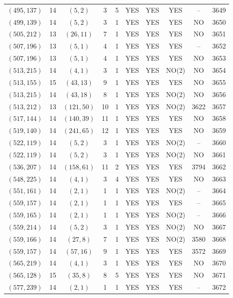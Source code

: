 \begin{longtable}{|c|c|c|c|c|c|c|c|c|c|}
$(495, 137)$ & 14 & $(5, 2)$ & 3 & 5 & YES & YES & YES & -- & 3649\\
$(499, 139)$ & 14 & $(5, 2)$ & 3 & 1 & YES & YES & YES & NO & 3650\\
$(505, 212)$ & 13 & $(26, 11)$ & 7 & 1 & YES & YES & YES & NO & 3651\\
$(507, 196)$ & 13 & $(5, 1)$ & 4 & 1 & YES & YES & YES & -- & 3652\\
$(507, 196)$ & 13 & $(5, 1)$ & 4 & 1 & YES & YES & YES & NO & 3653\\
$(513, 215)$ & 14 & $(4, 1)$ & 3 & 1 & YES & YES & NO(2) & NO & 3654\\
$(513, 155)$ & 15 & $(43, 13)$ & 9 & 1 & YES & YES & YES & NO & 3655\\
$(513, 215)$ & 14 & $(43, 18)$ & 8 & 1 & YES & YES & NO(2) & NO & 3656\\
$(513, 212)$ & 13 & $(121, 50)$ & 10 & 1 & YES & YES & NO(2) & 3622 & 3657\\
$(517, 144)$ & 14 & $(140, 39)$ & 11 & 1 & YES & YES & YES & NO & 3658\\
$(519, 140)$ & 14 & $(241, 65)$ & 12 & 1 & YES & YES & YES & NO & 3659\\
$(522, 119)$ & 14 & $(5, 2)$ & 3 & 1 & YES & YES & NO(2) & -- & 3660\\
$(522, 119)$ & 14 & $(5, 2)$ & 3 & 1 & YES & YES & NO(2) & NO & 3661\\
$(536, 207)$ & 14 & $(158, 61)$ & 11 & 2 & YES & YES & YES & 3794 & 3662\\
$(548, 225)$ & 14 & $(4, 1)$ & 3 & 4 & YES & YES & YES & NO & 3663\\
$(551, 161)$ & 14 & $(2, 1)$ & 1 & 1 & YES & YES & NO(2) & -- & 3664\\
$(559, 157)$ & 14 & $(2, 1)$ & 1 & 1 & YES & YES & YES & -- & 3665\\
$(559, 165)$ & 14 & $(2, 1)$ & 1 & 1 & YES & YES & NO(2) & -- & 3666\\
$(559, 214)$ & 14 & $(5, 2)$ & 3 & 1 & YES & YES & NO(2) & NO & 3667\\
$(559, 166)$ & 14 & $(27, 8)$ & 7 & 1 & YES & YES & NO(2) & 3580 & 3668\\
$(559, 157)$ & 14 & $(57, 16)$ & 9 & 1 & YES & YES & YES & 3572 & 3669\\
$(565, 219)$ & 14 & $(4, 1)$ & 3 & 1 & YES & YES & YES & NO & 3670\\
$(565, 128)$ & 15 & $(35, 8)$ & 8 & 5 & YES & YES & YES & NO & 3671\\
$(577, 239)$ & 14 & $(2, 1)$ & 1 & 1 & YES & YES & YES & -- & 3672\\

\end{longtable}
